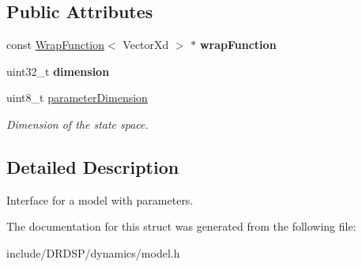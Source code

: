 \subsection*{Public Attributes}
\begin{DoxyCompactItemize}
\item 
\hypertarget{struct_d_r_d_s_p_1_1_model_parameterized_a65c8933121ff4801985cea23d00a3b1d}{const \hyperlink{struct_d_r_d_s_p_1_1_wrap_function}{Wrap\-Function}$<$ Vector\-Xd $>$ $\ast$ {\bfseries wrap\-Function}}\label{struct_d_r_d_s_p_1_1_model_parameterized_a65c8933121ff4801985cea23d00a3b1d}

\item 
\hypertarget{struct_d_r_d_s_p_1_1_model_parameterized_a80a78be5602accbde02f804ec1284be8}{uint32\-\_\-t {\bfseries dimension}}\label{struct_d_r_d_s_p_1_1_model_parameterized_a80a78be5602accbde02f804ec1284be8}

\item 
\hypertarget{struct_d_r_d_s_p_1_1_model_parameterized_a0ac0ef55c53f1b2361c32b9594ad081e}{uint8\-\_\-t \hyperlink{struct_d_r_d_s_p_1_1_model_parameterized_a0ac0ef55c53f1b2361c32b9594ad081e}{parameter\-Dimension}}\label{struct_d_r_d_s_p_1_1_model_parameterized_a0ac0ef55c53f1b2361c32b9594ad081e}

\begin{DoxyCompactList}\small\item\em Dimension of the state space. \end{DoxyCompactList}\end{DoxyCompactItemize}


\subsection{Detailed Description}
Interface for a model with parameters. 

The documentation for this struct was generated from the following file\-:\begin{DoxyCompactItemize}
\item 
include/\-D\-R\-D\-S\-P/dynamics/model.\-h\end{DoxyCompactItemize}
